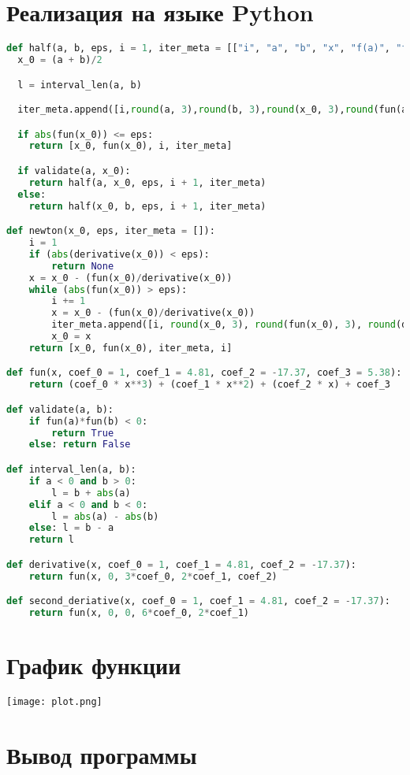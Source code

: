 \documentclass[12pt, a4paper]{article}
\begin{document}
\section*{Реализация на языке Python}
\begin{lstlisting}[language=Python]
def half(a, b, eps, i = 1, iter_meta = [["i", "a", "b", "x", "f(a)", "f(b)", "f(x)", "len"]]):
  x_0 = (a + b)/2

  l = interval_len(a, b)

  iter_meta.append([i,round(a, 3),round(b, 3),round(x_0, 3),round(fun(a), 3),round(fun(b), 3),round(fun(x_0), 3),round(l, 3)])

  if abs(fun(x_0)) <= eps:
    return [x_0, fun(x_0), i, iter_meta]

  if validate(a, x_0):
    return half(a, x_0, eps, i + 1, iter_meta)
  else:
    return half(x_0, b, eps, i + 1, iter_meta)

def newton(x_0, eps, iter_meta = []):
    i = 1
    if (abs(derivative(x_0)) < eps):
        return None
    x = x_0 - (fun(x_0)/derivative(x_0))
    while (abs(fun(x_0)) > eps):
        i += 1
        x = x_0 - (fun(x_0)/derivative(x_0))
        iter_meta.append([i, round(x_0, 3), round(fun(x_0), 3), round(derivative(x_0), 3), round(x, 3), round(abs(x_0 - x), 3)])
        x_0 = x
    return [x_0, fun(x_0), iter_meta, i]

def fun(x, coef_0 = 1, coef_1 = 4.81, coef_2 = -17.37, coef_3 = 5.38):
    return (coef_0 * x**3) + (coef_1 * x**2) + (coef_2 * x) + coef_3

def validate(a, b):
    if fun(a)*fun(b) < 0:
        return True
    else: return False

def interval_len(a, b):
    if a < 0 and b > 0:
        l = b + abs(a)
    elif a < 0 and b < 0:
        l = abs(a) - abs(b)
    else: l = b - a
    return l

def derivative(x, coef_0 = 1, coef_1 = 4.81, coef_2 = -17.37):
    return fun(x, 0, 3*coef_0, 2*coef_1, coef_2)

def second_deriative(x, coef_0 = 1, coef_1 = 4.81, coef_2 = -17.37):
    return fun(x, 0, 0, 6*coef_0, 2*coef_1)
\end{lstlisting}

\section*{График функции}
\texttt{[image: plot.png]}

\section*{Вывод программы}
\end{document}

